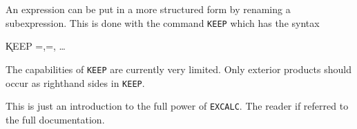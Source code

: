 An expression can be put in a more structured form by renaming a
subexpression.  This is done with the command {\tt KEEP} which
has the syntax\label{KEEP}

\hspace*{2em} \k{KEEP}
=,=, \ldots

The capabilities of {\tt KEEP} are currently very limited.  Only exterior
products should occur as righthand sides in {\tt KEEP}.

This is just an introduction to the full power of {\tt EXCALC}.  The
reader if referred to the full documentation.

